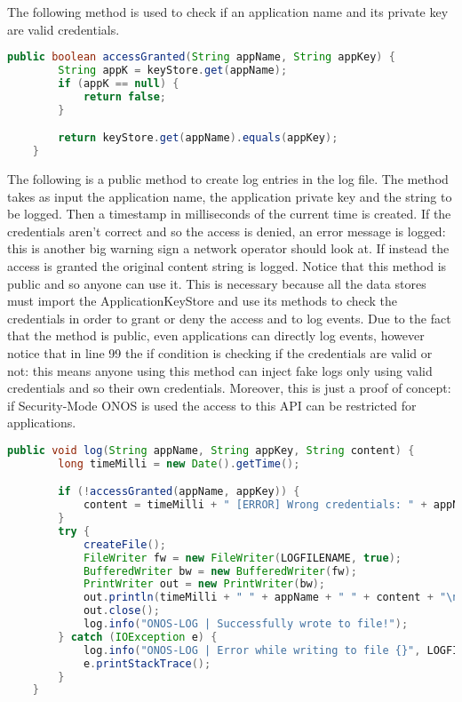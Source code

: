\documentclass[a4paper,10pt]{memoir}
\begin{document}
The following method is used to check if an application name and its private key are valid credentials.
\begin{lstlisting}[language=java,firstnumber=98]
    public boolean accessGranted(String appName, String appKey) {
        String appK = keyStore.get(appName);
        if (appK == null) {
            return false;
        }

        return keyStore.get(appName).equals(appKey);
    }
\end{lstlisting}

The following is a public method to create log entries in the log file. The method takes as input the application name, the application private key and the string to be logged. Then a timestamp in milliseconds of the current time is created. If the credentials aren't correct and so the access is denied, an error message is logged: this is another big warning sign a network operator should look at. If instead the access is granted the original content string is logged. Notice that this method is public and so anyone can use it. This is necessary because all the data stores must import the ApplicationKeyStore and use its methods to check the credentials in order to grant or deny the access and to log events. Due to the fact that the method is public, even applications can directly log events, however notice that in line 99 the if condition is checking if the credentials are valid or not: this means anyone using this method can inject fake logs only using valid credentials and so their own credentials. Moreover, this is just a proof of concept: if Security-Mode ONOS is used the access to this API can be restricted for applications.
\begin{lstlisting}[language=java,firstnumber=107]
    public void log(String appName, String appKey, String content) {
        long timeMilli = new Date().getTime();

        if (!accessGranted(appName, appKey)) {
            content = timeMilli + " [ERROR] Wrong credentials: " + appName + " " + appKey + " " + content;
        }
        try {
            createFile();
            FileWriter fw = new FileWriter(LOGFILENAME, true);
            BufferedWriter bw = new BufferedWriter(fw);
            PrintWriter out = new PrintWriter(bw);
            out.println(timeMilli + " " + appName + " " + content + "\n");
            out.close();
            log.info("ONOS-LOG | Successfully wrote to file!");
        } catch (IOException e) {
            log.info("ONOS-LOG | Error while writing to file {}", LOGFILENAME);
            e.printStackTrace();
        }
    }
\end{lstlisting}
\end{document}
